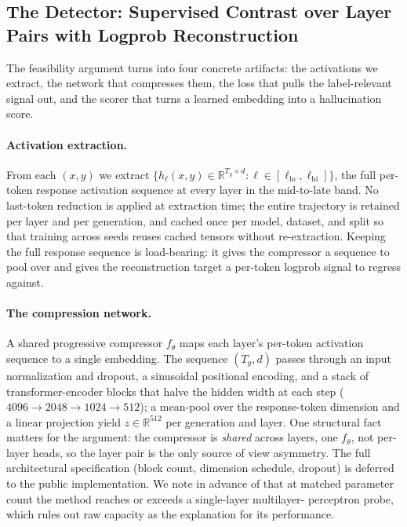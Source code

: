 \subsection{The Detector: Supervised Contrast over Layer Pairs with Logprob Reconstruction}
\label{subsec:hd:detector}

The feasibility argument turns into four concrete artifacts: the activations we
extract, the network that compresses them, the loss that pulls the
label-relevant signal out, and the scorer that turns a learned embedding into a
hallucination score.

\paragraph{Activation extraction.}
From each $(x,y)$ we extract
$\{ h_\ell(x,y) \in \mathbb{R}^{T_y \times d} : \ell \in [\ell_{\mathrm{lo}}, \ell_{\mathrm{hi}}] \}$,
the full per-token response activation sequence at every layer in the
mid-to-late band. No last-token reduction is applied at extraction time; the
entire trajectory is retained per layer and per generation, and cached once per
model, dataset, and split so that training across seeds reuses cached tensors
without re-extraction. Keeping the full response sequence is load-bearing: it
gives the compressor a sequence to pool over and gives the reconstruction target
a per-token logprob signal to regress against.

\paragraph{The compression network.}
A shared progressive compressor $f_\theta$ maps each layer's per-token activation
sequence to a single embedding. The sequence $(T_y, d)$ passes through an input
normalization and dropout, a sinusoidal positional encoding, and a stack of
transformer-encoder blocks that halve the hidden width at each step
($4096 \to 2048 \to 1024 \to 512$); a mean-pool over the response-token
dimension and a linear projection yield $z \in \mathbb{R}^{512}$ per generation
and layer. One structural fact matters for the argument: the compressor is
\emph{shared} across layers, one $f_\theta$, not per-layer heads, so the layer
pair is the only source of view asymmetry. The full architectural specification
(block count, dimension schedule, dropout) is deferred to the public
implementation. We note in advance of  that at matched
parameter count the method reaches or exceeds a single-layer multilayer-
perceptron probe, which rules out raw capacity as the explanation for its
performance.


